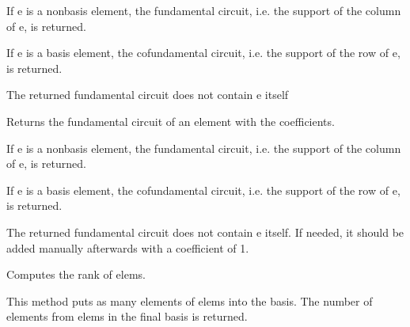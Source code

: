 \documentclass[letterpaper,12pt,english]{sphinxmanual}
\begin{document}
\begin{fulllineitems}
\begin{fulllineitems}
\sphinxAtStartPar
If e is a non\sphinxhyphen{}basis element, the fundamental circuit, i.e. the support of the
column of e, is returned.

\sphinxAtStartPar
If e is a basis element, the cofundamental circuit, i.e. the support of the row
of e, is returned.

\sphinxAtStartPar
The returned fundamental circuit does not contain e itself

\end{fulllineitems}


\begin{fulllineitems}
\label{\detokenize{api/modules:cbmpy.fluxmodules.matroid.Matroid.fundamentalCircuitValues}}
\pysigstartsignatures
\pysiglinewithargsret
{}
{}
{}
\pysigstopsignatures
\sphinxAtStartPar
Returns the fundamental circuit of an element with the coefficients.

\sphinxAtStartPar
If e is a non\sphinxhyphen{}basis element, the fundamental circuit, i.e. the support of the
column of e, is returned.

\sphinxAtStartPar
If e is a basis element, the cofundamental circuit, i.e. the support of the row
of e, is returned.

\sphinxAtStartPar
The returned fundamental circuit does not contain e itself. If needed, it should
be added manually afterwards with a coefficient of 1.

\end{fulllineitems}


\begin{fulllineitems}
\label{\detokenize{api/modules:cbmpy.fluxmodules.matroid.Matroid.rank}}
\pysigstartsignatures
\pysiglinewithargsret
{}
{}
{}
\pysigstopsignatures
\sphinxAtStartPar
Computes the rank of elems.

\sphinxAtStartPar
This method puts as many elements of elems into the basis. The number of
elements from elems in the final basis is returned.

\end{fulllineitems}


\end{fulllineitems}
\end{document}
